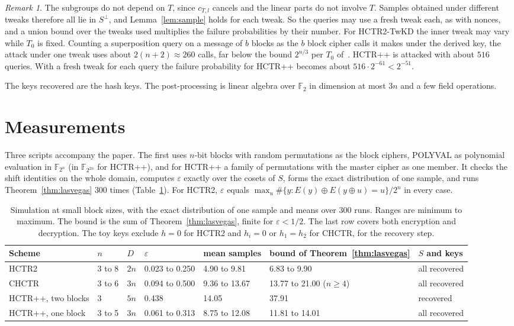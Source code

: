 \documentclass[11pt]{article}
\theoremstyle{definition}
\theoremstyle{remark}
\newtheorem{remark}[theorem]{Remark}
\newcommand{\F}{\mathbb{F}}
\newcommand{\eps}{\varepsilon}
\begin{document}
\begin{remark}\label{rem:tweak}
The subgroups do not depend on $T$, since $c_{T,l}$ cancels and the linear parts do not involve $T$. Samples obtained under different tweaks therefore all lie in $S^\perp$, and Lemma~\ref{lem:sample} holds for each tweak. So the queries may use a fresh tweak each, as with nonces, and a union bound over the tweaks used multiplies the failure probabilities by their number. For HCTR2-TwKD the inner tweak may vary while $T_0$ is fixed. Counting a superposition query on a message of $b$ blocks as the $b$ block cipher calls it makes under the derived key, the attack under one tweak uses about $2(n+2)\approx260$ calls, far below the bound $2^{n/3}$ per $T_0$ of~\cite{CHMNSS26}. HCTR++ is attacked with about $516$ queries. With a fresh tweak for each query the failure probability for HCTR++ becomes about $516\cdot2^{-61}<2^{-51}$.
\end{remark}

The keys recovered are the hash keys. The post-processing is linear algebra over $\F_2$ in dimension at most $3n$ and a few field operations.

\section{Measurements}\label{sec:sim}

Three scripts accompany the paper. The first uses $n$-bit blocks with random permutations as the block ciphers, POLYVAL as polynomial evaluation in $\F_{2^n}$ (in $\F_{2^{2n}}$ for HCTR++), and for HCTR++ a family of permutations with the master cipher as one member. It checks the shift identities on the whole domain, computes $\eps$ exactly over the cosets of $S$, forms the exact distribution of one sample, and runs Theorem~\ref{thm:lasvegas} $300$ times (Table~\ref{tab:sim}). For HCTR2, $\eps$ equals $\max_u\#\{y:E(y)\oplus E(y\oplus u)=u\}/2^n$ in every case.

\begin{table}[h]
\centering
\scriptsize
\begin{tabular}{@{}lllllll@{}}
\toprule
Scheme & $n$ & $D$ & $\eps$ & mean samples & bound of Theorem~\ref{thm:lasvegas} & $S$ and keys\\
\midrule
HCTR2 & 3 to 8 & $2n$ & 0.023 to 0.250 & 4.90 to 9.81 & 6.83 to 9.90 & all recovered\\
CHCTR & 3 to 6 & $3n$ & 0.094 to 0.500 & 9.36 to 13.67 & 13.77 to 21.00 ($n\ge4$) & all recovered\\
HCTR++, two blocks & 3 & $5n$ & 0.438 & 14.05 & 37.91 & recovered\\
HCTR++, one block & 3 to 5 & $3n$ & 0.061 to 0.313 & 8.75 to 12.08 & 11.81 to 14.01 & all recovered\\
\bottomrule
\end{tabular}
\caption{Simulation at small block sizes, with the exact distribution of one sample and means over $300$ runs. Ranges are minimum to maximum. The bound is the sum of Theorem~\ref{thm:lasvegas}, finite for $\eps<1/2$. The last row covers both encryption and decryption. The toy keys exclude $h=0$ for HCTR2 and $h_i=0$ or $h_1=h_2$ for CHCTR, for the recovery step.}
\label{tab:sim}
\end{table}
\end{document}
